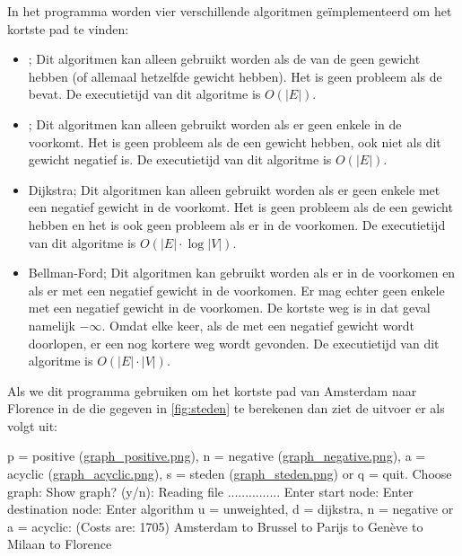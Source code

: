 In het programma  worden vier verschillende algoritmen geïmplementeerd om het kortste pad te vinden:
\begin{itemize}
	\item {}; Dit algoritmen kan alleen gebruikt worden als de  van de  geen gewicht hebben (of allemaal hetzelfde gewicht hebben).
	Het is geen probleem als de   bevat.
	De executietijd van dit algoritme is $O(|E|)$.
	\item {}; Dit algoritmen kan alleen gebruikt worden als er geen enkele  in de  voorkomt.
	Het is geen probleem als de  een gewicht hebben, ook niet als dit gewicht negatief is.
	De executietijd van dit algoritme is $O(|E|)$.
	\item Dijkstra; Dit algoritmen kan alleen gebruikt worden als er geen enkele  met een negatief gewicht in de  voorkomt.
	Het is geen probleem als de  een gewicht hebben en het is ook geen probleem als er  in de  voorkomen.
	De executietijd van dit algoritme is $O(|E|\cdot{}\log{|V|})$.
	\item Bellman-Ford; Dit algoritmen kan gebruikt worden als er  in de  voorkomen en als er  met een negatief gewicht in de  voorkomen.
	Er mag echter geen enkele  met een negatief gewicht in de  voorkomen.
	De kortste weg is in dat geval namelijk $-\infty{}$.
	Omdat elke keer, als de  met een negatief gewicht wordt doorlopen, er een nog kortere weg wordt gevonden.
	De executietijd van dit algoritme is $O(|E|\cdot{}|V|)$.
\end{itemize}

Als we dit programma gebruiken om het kortste pad van Amsterdam naar Florence in de  die gegeven in \cref{fig:steden} te berekenen dan ziet de uitvoer er als volgt uit:

\begin{coutput}
p = positive (\href{\wikiurl/graph_positive.png}{graph_positive.png}),
n = negative (\href{\wikiurl/graph_negative.png}{graph_negative.png}),
a = acyclic  (\href{\wikiurl/graph_acyclic.png}{graph_acyclic.png}),
s = steden   (\href{\wikiurl/graph_steden.png}{graph_steden.png}) or
q = quit.
Choose graph: 
Show graph? (y/n): 
Reading file ...............
Enter start node: 
Enter destination node: 
Enter algorithm u = unweighted, d = dijkstra, n = negative or 
a = acyclic: 
(Costs are: 1705) Amsterdam to Brussel to Parijs to Genève to Milaan
to Florence
\end{coutput}

